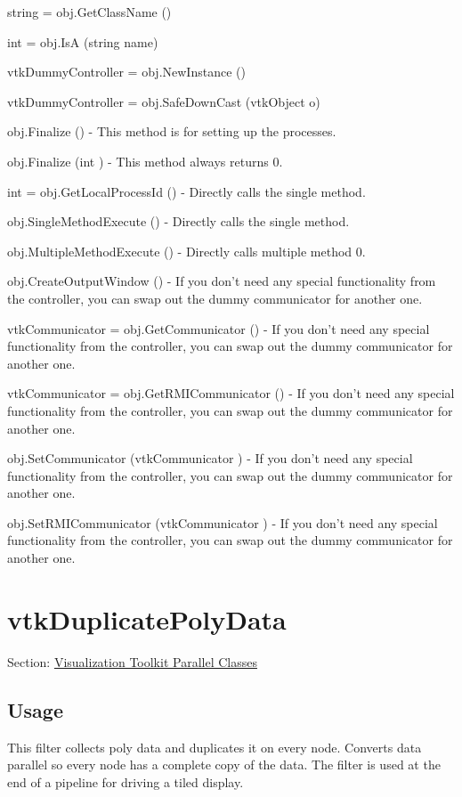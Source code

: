\begin{DoxyItemize}
\item {\ttfamily string = obj.\-Get\-Class\-Name ()}  
\item {\ttfamily int = obj.\-Is\-A (string name)}  
\item {\ttfamily vtk\-Dummy\-Controller = obj.\-New\-Instance ()}  
\item {\ttfamily vtk\-Dummy\-Controller = obj.\-Safe\-Down\-Cast (vtk\-Object o)}  
\item {\ttfamily obj.\-Finalize ()} -\/ This method is for setting up the processes.  
\item {\ttfamily obj.\-Finalize (int )} -\/ This method always returns 0.  
\item {\ttfamily int = obj.\-Get\-Local\-Process\-Id ()} -\/ Directly calls the single method.  
\item {\ttfamily obj.\-Single\-Method\-Execute ()} -\/ Directly calls the single method.  
\item {\ttfamily obj.\-Multiple\-Method\-Execute ()} -\/ Directly calls multiple method 0.  
\item {\ttfamily obj.\-Create\-Output\-Window ()} -\/ If you don't need any special functionality from the controller, you can swap out the dummy communicator for another one.  
\item {\ttfamily vtk\-Communicator = obj.\-Get\-Communicator ()} -\/ If you don't need any special functionality from the controller, you can swap out the dummy communicator for another one.  
\item {\ttfamily vtk\-Communicator = obj.\-Get\-R\-M\-I\-Communicator ()} -\/ If you don't need any special functionality from the controller, you can swap out the dummy communicator for another one.  
\item {\ttfamily obj.\-Set\-Communicator (vtk\-Communicator )} -\/ If you don't need any special functionality from the controller, you can swap out the dummy communicator for another one.  
\item {\ttfamily obj.\-Set\-R\-M\-I\-Communicator (vtk\-Communicator )} -\/ If you don't need any special functionality from the controller, you can swap out the dummy communicator for another one.  
\end{DoxyItemize}\hypertarget{vtkparallel_vtkduplicatepolydata}{}\section{vtk\-Duplicate\-Poly\-Data}\label{vtkparallel_vtkduplicatepolydata}
Section\-: \hyperlink{sec_vtkparallel}{Visualization Toolkit Parallel Classes} \hypertarget{vtkwidgets_vtkxyplotwidget_Usage}{}\subsection{Usage}\label{vtkwidgets_vtkxyplotwidget_Usage}
This filter collects poly data and duplicates it on every node. Converts data parallel so every node has a complete copy of the data. The filter is used at the end of a pipeline for driving a tiled display.

